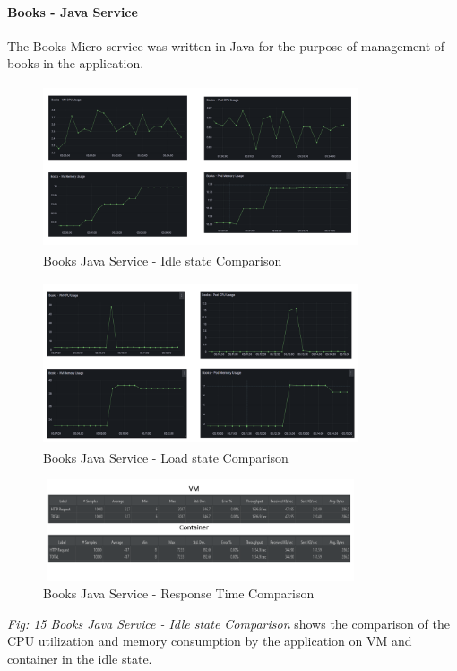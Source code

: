 \paragraph{ Books - Java Service} The Books Micro service was written in Java for the purpose of management of books in the application.  
\begin{figure}[!h]
    \centering
    \includegraphics[width=9.3cm, height=4.8cm]{images/book-cpu-idle-comp.png}
    \caption{Books Java Service - Idle state Comparison}
\end{figure}
\begin{figure}[!h]
    \centering
    \includegraphics[width=9.3cm, height=4.8cm]{images/book-cpu-load-comp.png}
    \caption{Books Java Service - Load state Comparison}
\end{figure}
\begin{figure}[!h]
    \centering
    \includegraphics[width=9.3cm, height=3cm]{images/book-response-comp.png}
    \caption{Books Java Service - Response Time Comparison}
\end{figure}
\emph{Fig: 15 Books Java Service - Idle state Comparison} shows the comparison of the CPU utilization and memory consumption by the application on VM and container in the idle state.
